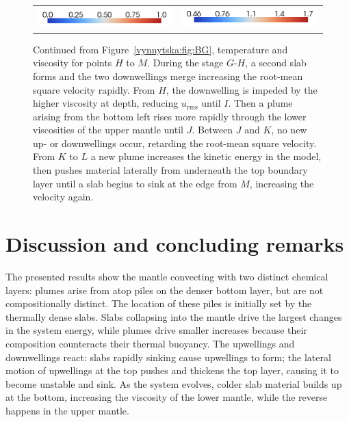 \begin{figure}
\begin{tabular}{cr}
    \includegraphics[width=\twofigs]{chapters/vynnytska/png/tmleg.png} &
    \includegraphics[width=\twofigs]{chapters/vynnytska/png/visleg.png}
  \end{tabular}
  \caption{Continued from Figure~\ref{vynnytska:fig:BG}, temperature and
    viscosity for points $H$ to $M$. During the stage $G$-$H$, a second
    slab forms and the two downwellings merge increasing the root-mean
    square velocity rapidly. From $H$, the downwelling is impeded by the
    higher viscosity at depth, reducing $u_{\mathrm{rms}}$ until $I$. Then a
    plume arising from the bottom left rises more rapidly through the
    lower viscosities of the upper mantle until $J$. Between $J$ and
    $K$, no new up- or downwellings occur, retarding the root-mean
    square velocity. From $K$ to $L$ a new plume increases the kinetic
    energy in the model, then pushes material laterally from underneath
    the top boundary layer until a slab begins to sink at the edge from
    $M$, increasing the velocity again.}
  \label{vynnytska:fig:HM}
\end{figure}


\section{Discussion and concluding remarks}

The presented results show the mantle convecting with two distinct
chemical layers: plumes arise from atop piles on the denser bottom layer,
but are not compositionally distinct. The location of these piles is
initially set by the thermally dense slabs. Slabs collapsing into the
mantle drive the largest changes in the system energy, while plumes
drive smaller increases because their composition counteracts their
thermal buoyancy. The upwellings and downwellings react: slabs rapidly
sinking cause upwellings to form; the lateral motion of upwellings at
the top pushes and thickens the top layer, causing it to become unstable
and sink. As the system evolves, colder slab material builds up at the
bottom, increasing the viscosity of the lower mantle, while the reverse
happens in the upper mantle.

